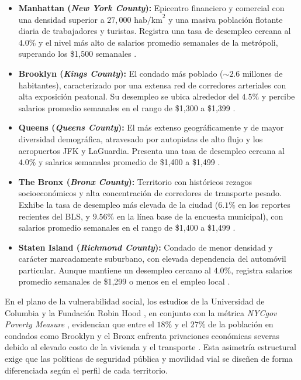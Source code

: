 \documentclass[11pt,a4paper]{article}
\begin{document}
\begin{itemize}
    \item \textbf{Manhattan (\textit{New York County}):} Epicentro financiero y comercial con una densidad superior a $27,000\text{ hab/km}^2$ y una masiva población flotante diaria de trabajadores y turistas. Registra una tasa de desempleo cercana al $4.0\%$ y el nivel más alto de salarios promedio semanales de la metrópoli, superando los \$1,500 semanales \cite{bls_nyc_2024}.

    \item \textbf{Brooklyn (\textit{Kings County}):} El condado más poblado ($\sim 2.6$ millones de habitantes), caracterizado por una extensa red de corredores arteriales con alta exposición peatonal. Su desempleo se ubica alrededor del $4.5\%$ y percibe salarios promedio semanales en el rango de \$1,300 a \$1,399 \cite{bls_nyc_2024}.

    \item \textbf{Queens (\textit{Queens County}):} El más extenso geográficamente y de mayor diversidad demográfica, atravesado por autopistas de alto flujo y los aeropuertos JFK y LaGuardia. Presenta una tasa de desempleo cercana al $4.0\%$ y salarios semanales promedio de \$1,400 a \$1,499 \cite{bls_nyc_2024}.

    \item \textbf{The Bronx (\textit{Bronx County}):} Territorio con históricos rezagos socioeconómicos y alta concentración de corredores de transporte pesado. Exhibe la tasa de desempleo más elevada de la ciudad ($6.1\%$ en los reportes recientes del BLS, y $9.56\%$ en la línea base de la encuesta municipal), con salarios promedio semanales en el rango de \$1,400 a \$1,499 \cite{bls_nyc_2024}.

    \item \textbf{Staten Island (\textit{Richmond County}):} Condado de menor densidad y carácter marcadamente suburbano, con elevada dependencia del automóvil particular. Aunque mantiene un desempleo cercano al $4.0\%$, registra salarios promedio semanales de \$1,299 o menos en el empleo local \cite{bls_nyc_2024}.
\end{itemize}

En el plano de la vulnerabilidad social, los estudios de la Universidad de Columbia y la Fundación Robin Hood \cite{columbia_robinhood_2024}, en conjunto con la métrica \textit{NYCgov Poverty Measure} \cite{nyc_opportunity_2024}, evidencian que entre el $18\%$ y el $27\%$ de la población en condados como Brooklyn y el Bronx enfrenta privaciones económicas severas debido al elevado costo de la vivienda y el transporte \cite{osc_nyc_economy_2024}. Esta asimetría estructural exige que las políticas de seguridad pública y movilidad vial se diseñen de forma diferenciada según el perfil de cada territorio.
\end{document}
